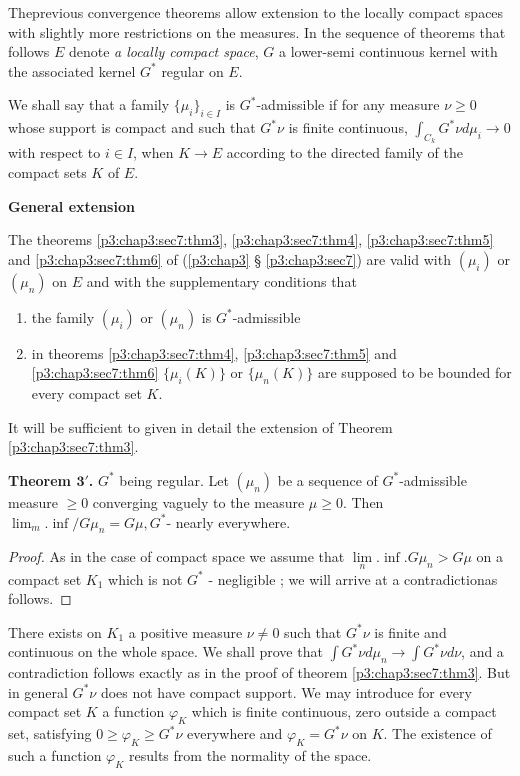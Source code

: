 The\pageoriginale previous convergence theorems allow extension to the locally
compact spaces with slightly more restrictions on the measures. In the
sequence of theorems that follows $E$ denote \textit{ a locally
  compact space}, $G$ a lower-semi continuous kernel with the
associated kernel $G^*$ regular on $E$.  

We shall say that a family $\{ \mu _i\}_{ i \in I}$ is $G^*$-admissible
if for any measure $\nu \geq 0$ whose support is compact and such that
$G^*\nu$ is finite continuous, $\int_{ C_k} G^* \nu d \mu _i \to 0$
 with respect to $i \in I$, when $K \to E$ according
to the directed family of the compact sets $K$ of $E$.  

\medskip
\noindent
\textbf{General extension}

The theorems \ref{p3:chap3:sec7:thm3}, \ref{p3:chap3:sec7:thm4},
\ref{p3:chap3:sec7:thm5} and \ref{p3:chap3:sec7:thm6} of (\ref{p3:chap3} \S
\ref{p3:chap3:sec7}) are valid with 
$(\mu_i)$ or $(\mu _n)$ on $E$ and with the supplementary conditions
that  
\begin{enumerate}[1)]
\item the  family $(\mu_i)$ or $(\mu_n)$ is $G^*$-admissible 
\item in theorems \ref{p3:chap3:sec7:thm4}, \ref{p3:chap3:sec7:thm5}
  and \ref{p3:chap3:sec7:thm6} $\{ \mu _i (K)\}$ or $\{ \mu_n(K) \}$
  are 
  supposed to be bounded for every compact set $K$.  
\end{enumerate}

It will be sufficient to given in detail the extension of Theorem
\ref{p3:chap3:sec7:thm3}.  

\noindent \textbf{Theorem $\mathbf{3'}$.}
  $G^* $ being regular. Let $(\mu _n)$ be a sequence of
  $G^*$-admissible measure $\geq 0$ converging vaguely to the measure
  $\mu \geq 0$. Then \break $\lim_m.\inf / G \mu _n = G \mu,  G^*$- nearly
  everywhere.  


\begin{proof}
  As in the case of compact space we assume that $\lim\limits_n.  \inf
 .  G \mu _n > G \mu$ on a compact set $K_1$ which is not $G^*$ -
  negligible ; we will arrive at a contradiction\pageoriginale as follows. 
\end{proof}

There exists on $K_1$ a positive measure $\nu \neq 0$ such that $G^*\nu $
is finite and continuous on the whole space. We shall prove that $\int
G^* \nu d \mu_n \to \int G^* \nu d \nu $, and a contradiction follows
exactly as in the proof of theorem \ref{p3:chap3:sec7:thm3}. But in general $G^* \nu $ does
not have compact support. We may introduce for every compact set $K$ a
function $\varphi _K$ which is finite continuous, zero outside a
compact set, satisfying $0 \geq \varphi _K\geq  G^*  \nu $ everywhere and
$\varphi _K = G^* \nu $ on $K$.  The existence of such a function
$\varphi_K$ results from the normality of the space.  


